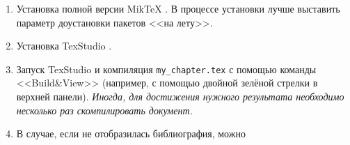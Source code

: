 \begin{enumerate}
	\item Установка полной версии MikTeX  \cite{latex-miktex}.  В процессе установки лучше выставить параметр доустановки пакетов <<на лету>>.
	
	\item Установка TexStudio \cite{latex-texstudio}.
	
	
%	
%	
%	
%	
	
	\item Запуск TexStudio и компиляция \verb|my_chapter.tex| с помощью команды <<Build\&View>> (например, с помощью двойной зелёной стрелки в верхней панели). {\itshape Иногда, для достижения нужного результата необходимо несколько раз скомпилировать документ.}
	
	\item В случае, если не отобразилась библиография, можно
	

\end{enumerate}
